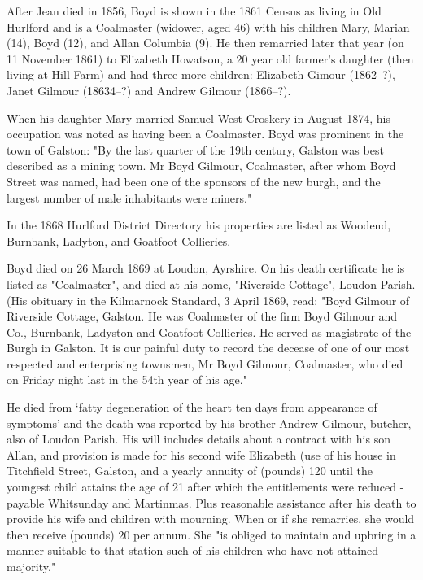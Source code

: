 After Jean died in 1856, Boyd is shown in the 1861 Census as living in Old Hurlford and is a Coalmaster (widower, aged 46) with his children Mary, Marian (14), Boyd (12), and Allan Columbia (9). He then remarried later that year (on 11 November 1861) to Elizabeth Howatson, a 20 year old farmer's daughter (then living at Hill Farm) and had three more children: Elizabeth Gimour (1862--?), Janet Gilmour (18634--?) and Andrew Gilmour (1866--?).

When his daughter Mary married Samuel West Croskery in August 1874,  his occupation was noted as having been a Coalmaster.\cite{SMWCmarriage}  Boyd was prominent in the town of Galston: "By the last quarter of the 19th century, Galston was best described as a mining town. Mr Boyd Gilmour, Coalmaster, after whom Boyd Street was named, had been one of the sponsors of the new burgh, and the largest number of male inhabitants were miners." 

In the 1868 Hurlford District Directory his properties are listed as Woodend, Burnbank, Ladyton, and Goatfoot Collieries.

Boyd died on 26 March 1869 at Loudon, Ayrshire. \cite{BGilmourDeath} On his death certificate he is listed as "Coalmaster", and died at his home, "Riverside Cottage", Loudon Parish. (His obituary in the Kilmarnock Standard, 3 April 1869, read:  "Boyd Gilmour of Riverside Cottage, Galston. He was Coalmaster of the firm Boyd Gilmour and Co., Burnbank, Ladyston and Goatfoot Collieries. He served as magistrate of the Burgh in Galston. It is our painful duty to record the decease of one of our most respected and enterprising townsmen, Mr Boyd Gilmour, Coalmaster, who died on Friday night last in the 54th year of his age." \cite{BGobituary}

  He died from `fatty degeneration of the heart ten days from appearance of symptoms' and the death was reported by his brother Andrew Gilmour, butcher, also of Loudon Parish. His will includes details about a contract with his son Allan, and provision is made for his second wife Elizabeth (use of his house in Titchfield Street, Galston, and a yearly annuity of (pounds) 120 until the youngest child attains the age of 21 after which the entitlements were reduced - payable Whitsunday and Martinmas. Plus reasonable assistance after his death to provide his wife and children with mourning. When or if she remarries, she would then receive (pounds) 20 per annum. She "is obliged to maintain and upbring in a manner suitable to that station such of his children who have not attained majority."      
  
